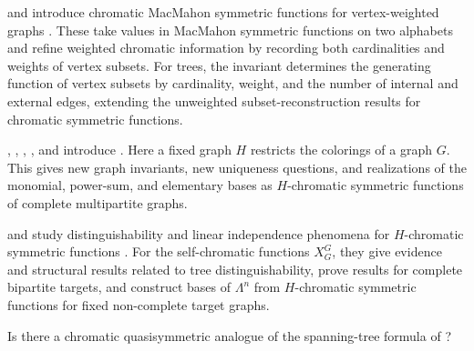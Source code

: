  and  introduce chromatic
MacMahon symmetric functions for vertex-weighted graphs
\cite{MartinTrist2025x}.  These take values in MacMahon symmetric functions
on two alphabets and refine weighted chromatic information by recording both
cardinalities and weights of vertex subsets.  For trees, the invariant
determines the generating function of vertex subsets by cardinality, weight,
and the number of internal and external edges, extending the unweighted
subset-reconstruction results for chromatic symmetric functions.

, , ,
, and  introduce
 \cite{EaglesFoleyHuangKarangozishviliYu2022}.
Here a fixed graph $H$ restricts the colorings of a graph $G$.  This gives
new graph invariants, new uniqueness questions, and realizations of the
monomial, power-sum, and elementary bases as $H$-chromatic symmetric
functions of complete multipartite graphs.

 and  study distinguishability and
linear independence phenomena for $H$-chromatic symmetric functions
\cite{LinPierson2025HChromaticx}.  For the self-chromatic functions $X_G^G$,
they give evidence and structural results related to tree distinguishability,
prove results for complete bipartite targets, and construct bases of
$\Lambda^n$ from $H$-chromatic symmetric functions for fixed non-complete
target graphs.

\begin{problem}
Is there a chromatic quasisymmetric analogue of the spanning-tree formula of
\cite{AliniaeifardWangvanWilligenburg2021}?
\end{problem}

